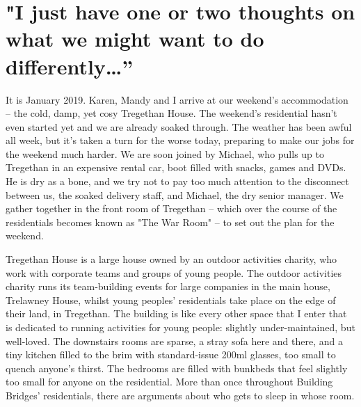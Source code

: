 \section{"I just have one or two thoughts on what we might want to do differently…”}
It is January 2019. Karen, Mandy and I arrive at our weekend’s accommodation – the cold, damp, yet cosy Tregethan House. The weekend's residential hasn’t even started yet and we are already soaked through. The weather has been awful all week, but it's taken a turn for the worse today, preparing to make our jobs for the weekend much harder. We are soon joined by Michael, who pulls up to Tregethan in an expensive rental car, boot filled with snacks, games and DVDs. He is dry as a bone, and we try not to pay too much attention to the disconnect between us, the soaked delivery staff, and Michael, the dry senior manager. We gather together in the front room of Tregethan – which over the course of the residentials becomes known as "The War Room" – to set out the plan for the weekend.

Tregethan House is a large house owned by an outdoor activities charity,  who work with corporate teams and groups of young people. The outdoor activities charity runs its team-building events for large companies in the main house, Trelawney House, whilst young peoples' residentials take place on the edge of their land, in Tregethan. The building is like every other space that I enter that is dedicated to running activities for young people: slightly under-maintained, but well-loved. The downstairs rooms are sparse, a stray sofa here and there, and a tiny kitchen filled to the brim with standard-issue 200ml glasses, too small to quench anyone's thirst. The bedrooms are filled with bunkbeds that feel slightly too small for anyone on the residential. More than once throughout Building Bridges' residentials, there are arguments about who gets to sleep in whose room. 

